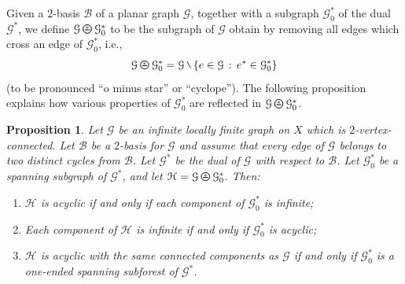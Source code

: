 \documentclass[11pt]{amsart}
\theoremstyle{definition}
\theoremstyle{plain}
\newtheorem{proposition}[definition]{Proposition}
\newcommand{\<}{\langle}
\renewcommand{\>}{\rangle}
\newcommand{\mc}[1]{\mathcal{#1}}
\newcommand{\Ggraph}{\mathcal{G}}
\newcommand{\Hgraph}{\mathcal{H}}
\newcommand{\oPerpStar}{\begin{tikzpicture}[scale=0.134]
\draw[thick,line width=0.7pt](-0.6,-0.2)--(0.6,-0.2) ;
    \draw (0,0.1) node[scale=0.6] {\rm{*}};
  \draw[line width=0.7pt] (0,0) circle [radius=1];
\end{tikzpicture}}
\newcommand{\oPerpstar}{\mathbin{\raisebox{-1pt}{\oPerpStar}}}
\newcommand{\mysetminusD}{\hbox{\tikz{\draw[line width=0.6pt,line cap=round] (3pt,0) -- (0,6pt);}}}
\newcommand{\mysetminusT}{\mysetminusD}
\newcommand{\mysetminusS}{\hbox{\tikz{\draw[line width=0.45pt,line cap=round] (2pt,0) -- (0,4pt);}}}
\newcommand{\mysetminusSS}{\hbox{\tikz{\draw[line width=0.4pt,line cap=round] (1.5pt,0) -- (0,3pt);}}}
\newcommand{\mysetminus}{\mathbin{\mathchoice{\mysetminusD}{\mysetminusT}{\mysetminusS}{\mysetminusSS}}}%
\begin{document}
Given a $2$-basis $\mc{B}$ of a planar graph $\Ggraph$, together with a subgraph $\Ggraph _0^*$ of the dual $\Ggraph ^*$, we define $\Ggraph \oPerpstar \Ggraph _0^*$ to be the subgraph of $\Ggraph$ obtain by removing all edges which cross an edge of $\Ggraph _0 ^*$, i.e.,
\begin{equation*}
\Ggraph \oPerpstar \Ggraph _0^* = {\Ggraph} \mysetminus \{ e\in {\Ggraph} \, : \, e^* \in {\Ggraph}^*_0 \}
\end{equation*}
(to be pronounced ``o minus star'' or ``cyclope'').
The following proposition explains how various properties of $\Ggraph _0^*$ are reflected in $\Ggraph \oPerpstar \Ggraph _0^*$.

\begin{proposition}\label{prop:duality}
Let ${\Ggraph}$ be an infinite locally finite graph on $X$ which is $2$-vertex-connected. Let $\mc{B}$ be a $2$-basis for ${\Ggraph}$ and assume that every edge of ${\Ggraph}$ belongs to two distinct cycles from $\mc{B}$. Let ${\Ggraph}^*$ be the dual of ${\Ggraph}$ with respect to $\mc{B}$. Let ${\Ggraph}^*_0$ be a spanning subgraph of ${\Ggraph}^*$, and let ${\Hgraph} =\Ggraph \oPerpstar \Ggraph _0^*$. Then:
\begin{enumerate}
\item ${\Hgraph}$ is acyclic if and only if each component of ${\Ggraph}^*_0$ is infinite;
\item Each component of ${\Hgraph}$ is infinite if and only if ${\Ggraph}^*_0$ is acyclic;
\item ${\Hgraph}$ is acyclic with the same connected components as ${\Ggraph}$ if and only if ${\Ggraph}_0^*$ is a one-ended spanning subforest of ${\Ggraph}^*$.
\end{enumerate}
\end{proposition}
\end{document}
